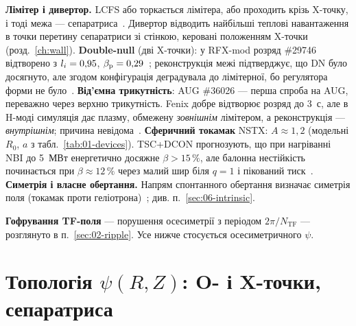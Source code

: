 \textbf{Лімітер і дивертор.} LCFS або торкається лімітера, або проходить крізь X-точку, і тоді межа --- сепаратриса~\cite[с.~30]{Merlo2011}. Дивертор відводить найбільші теплові навантаження в точки перетину сепаратриси зі стінкою, керовані положенням X-точки (розд.~\ref{ch:wall}). \textbf{Double-null} (дві X-точки): у RFX-mod розряд \#29746 відтворено з $l_{i}=0{,}95$, $\beta_{\mathrm{p}}=0{,}29$~\cite[с.~38]{Merlo2011}; реконструкція межі підтверджує, що DN було досягнуто, але згодом конфігурація деградувала до лімітерної, бо регулятора форми не було~\cite[с.~54]{Merlo2011}. \textbf{Від'ємна трикутність}: AUG \#36026 --- перша спроба на AUG, переважно через верхню трикутність. Fenix добре відтворює розряд до \SI{3}{с}, але в H-моді симуляція дає плазму, обмежену \emph{зовнішнім} лімітером, а реконструкція --- \emph{внутрішнім}; причина невідома~\cite[с.~7--8]{Fable2022}. \textbf{Сферичний токамак} NSTX: $A\approx1{,}2$ (модельні $R_0$, $a$ з табл.~\ref{tab:01-devices}). TSC+DCON прогнозують, що при нагріванні NBI до \SI{5}{МВт} енергетично досяжне $\beta>15\,\%$, але балонна нестійкість починається при $\beta\approx12\,\%$ через малий шир біля $q=1$ і пікований тиск~\cite[с.~5]{Jardin2000}. \textbf{Симетрія і власне обертання.} Напрям спонтанного обертання визначає симетрія поля (токамак проти геліотрона)~\cite[с.~6--7]{Ida2001}; див. п.~\ref{sec:06-intrinsic}.

\textbf{Гофрування TF-поля} --- порушення осесиметрії з періодом $2\pi/N_{\mathrm{TF}}$ --- розглянуто в п.~\ref{sec:02-ripple}. Усе нижче стосується осесиметричного $\psi$.

\section{Топологія $\psi(R,Z)$: O- і X-точки, сепаратриса}\label{sec:04-topology}

